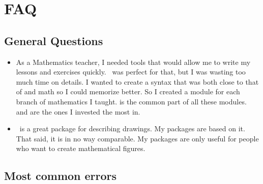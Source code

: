 \section{FAQ}

\subsection{General Questions}

\begin{itemize}\setlength{\itemsep}{10pt}

\item {} As a Mathematics teacher, I needed
tools that would allow me to write my lessons and exercises quickly. \TIKZ\ was
perfect for that, but I was wasting too much time on details. I wanted to create
a syntax that was both close to that of \LATEX and math so I could memorize
better. So I created a module for each branch of mathematics I taught.
 is the common part of all these modules.
 and  are the ones I invested
the most in.

\item  {} \TIKZ\ is a great package for
describing drawings. My packages are based on it. That said, it is in no way
comparable. My packages are only useful for people who want to create
mathematical figures.
\end{itemize}

\subsection{Most common errors}


